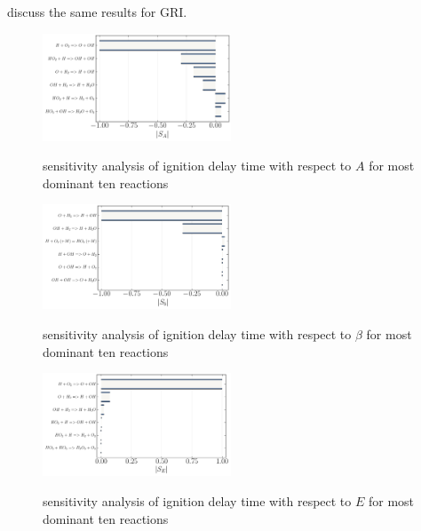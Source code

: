 \documentclass[preprint,review,12pt]{elsarticle}
\begin{document}
  {\color{red} discuss the same results for GRI}.
\begin{figure}
\centering
 {\includegraphics[width=0.5\textwidth]{figures/H2_SA_Validation.pdf}}
\caption{sensitivity analysis of ignition delay time with respect to $A$ for most dominant ten reactions}
    \label{fig:figure4}
\end{figure}

\begin{figure}
\centering
 {\includegraphics[width=0.5\textwidth]{figures/H2_Sb_Validation.pdf}}
\caption{sensitivity analysis of ignition delay time with respect to $\beta$ for most dominant ten reactions}
    \label{fig:figure5}
\end{figure}

\begin{figure}
\centering
 {\includegraphics[width=0.5\textwidth]{figures/H2_SE_Validation.pdf}}
\caption{sensitivity analysis of ignition delay time with respect to $E$ for most dominant ten reactions}
    \label{fig:figure6}
\end{figure}
\end{document}
